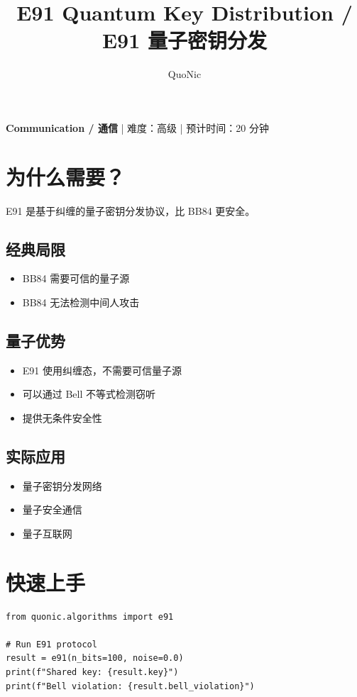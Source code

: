 \documentclass[12pt,a4paper]{article}
\title{E91 Quantum Key Distribution / E91 量子密钥分发}
\author{QuoNic}
\date{}
\begin{document}
\maketitle

\begin{center}
\textbf{Communication / 通信} | 难度：高级 | 预计时间：20 分钟
\end{center}

\tableofcontents
\newpage

\section{为什么需要？}

E91 是基于纠缠的量子密钥分发协议，比 BB84 更安全。

\subsection{经典局限}
\begin{itemize}
  \item BB84 需要可信的量子源
  \item BB84 无法检测中间人攻击
\end{itemize}

\subsection{量子优势}
\begin{itemize}
  \item E91 使用纠缠态，不需要可信量子源
  \item 可以通过 Bell 不等式检测窃听
  \item 提供无条件安全性
\end{itemize}

\subsection{实际应用}
\begin{itemize}
  \item 量子密钥分发网络
  \item 量子安全通信
  \item 量子互联网
\end{itemize}

\section{快速上手}

\begin{lstlisting}[style=python]
from quonic.algorithms import e91

# Run E91 protocol
result = e91(n_bits=100, noise=0.0)
print(f"Shared key: {result.key}")
print(f"Bell violation: {result.bell_violation}")
\end{lstlisting}
\end{document}

